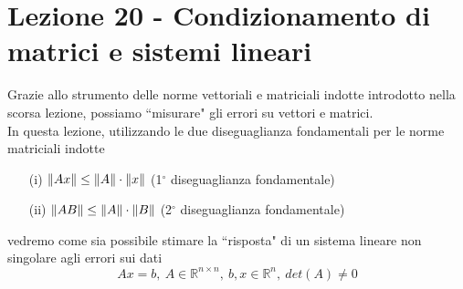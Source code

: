 \documentclass[12pt,a4paper]{article}
\DeclarePairedDelimiter{\norma}{\lVert}{\rVert}
\begin{document}
\section{Lezione 20 - Condizionamento di matrici e sistemi lineari}

Grazie allo strumento delle norme vettoriali e matriciali indotte introdotto nella scorsa lezione, possiamo ``misurare" gli errori su vettori e matrici.\\
In questa lezione, utilizzando le due diseguaglianza fondamentali per le norme matriciali indotte
\begin{itemize}
    \item[(i)]$\norma{Ax} \leq \norma{A}\cdot\norma{x}$ (1$^\circ$ diseguaglianza fondamentale)
    \item[(ii)] $\norma{AB} \leq \norma{A} \cdot\norma{B}$ (2$^\circ$ diseguaglianza fondamentale)
\end{itemize}
vedremo come sia possibile stimare la ``risposta" di un sistema lineare non singolare agli errori sui dati
\begin{equation*}
    Ax=b, \ A\in \mathbb{R}^{n\times n}, \ b,x\in \mathbb{R}^n, \ det(A) \neq 0
\end{equation*}
\end{document}
